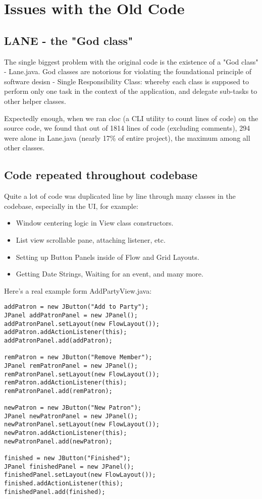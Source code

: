 \section{Issues with the Old Code}

\subsection{LANE - the "God class"}

The single biggest problem with the original code is the existence of a "God class" - Lane.java. God classes are notorious for violating the foundational principle of software desisn - Single Responsibility Class: whereby each class is supposed to perform only one task in the context of the application, and delegate sub-tasks to other helper classes.

Expectedly enough, when we ran \textrm{cloc} (a CLI utility to count lines of code) on the source code, we found that out of 1814 lines of code (excluding comments), 294 were alone in Lane.java (nearly 17\% of entire project), the maximum among all other classes.

\subsection{Code repeated throughout codebase}

Quite a lot of code was duplicated line by line through many classes in the codebase, especially in the UI, for example:

\begin{itemize}
	\item Window centering logic in View class constructors.
	\item List view scrollable pane, attaching listener, etc.
	\item Setting up Button Panels inside of Flow and Grid Layouts.
	\item Getting Date Strings, Waiting for an event, and many more.
\end{itemize}

Here's a real example form AddPartyView.java:

\begin{verbatim}
addPatron = new JButton("Add to Party");
JPanel addPatronPanel = new JPanel();
addPatronPanel.setLayout(new FlowLayout());
addPatron.addActionListener(this);
addPatronPanel.add(addPatron);

remPatron = new JButton("Remove Member");
JPanel remPatronPanel = new JPanel();
remPatronPanel.setLayout(new FlowLayout());
remPatron.addActionListener(this);
remPatronPanel.add(remPatron);

newPatron = new JButton("New Patron");
JPanel newPatronPanel = new JPanel();
newPatronPanel.setLayout(new FlowLayout());
newPatron.addActionListener(this);
newPatronPanel.add(newPatron);

finished = new JButton("Finished");
JPanel finishedPanel = new JPanel();
finishedPanel.setLayout(new FlowLayout());
finished.addActionListener(this);
finishedPanel.add(finished);
\end{verbatim}


